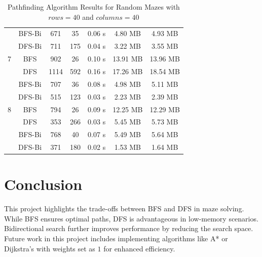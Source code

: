 \documentclass[final, journal, 11pt]{report}
\begin{document}
\begin{table}[!htbp]
\begin{tabular}{@{}ccccccc@{}}
	  & BFS-Bi    & 671  & 35   & 0.06 s & 4.80 MB  & 4.93 MB  \\
	  & DFS-Bi    & 711  & 175  & 0.04 s & 3.22 MB  & 3.55 MB  \\ \midrule
	7 & BFS       & 902  & 26   & 0.10 s & 13.91 MB & 13.96 MB \\
	  & DFS       & 1114 & 592  & 0.16 s & 17.26 MB & 18.54 MB \\
	  & BFS-Bi    & 707  & 36   & 0.08 s & 4.98 MB  & 5.11 MB  \\
	  & DFS-Bi    & 515  & 123  & 0.03 s & 2.23 MB  & 2.39 MB  \\ \midrule
	8 & BFS       & 794  & 26   & 0.09 s & 12.25 MB & 12.29 MB \\
	  & DFS       & 353  & 266  & 0.03 s & 5.45 MB  & 5.73 MB  \\
	  & BFS-Bi    & 768  & 40   & 0.07 s & 5.49 MB  & 5.64 MB  \\
	  & DFS-Bi    & 371  & 180  & 0.02 s & 1.53 MB  & 1.64 MB  \\ \bottomrule
	\end{tabular}
	\caption{Pathfinding Algorithm Results for Random Mazes with $rows = 40$ and $columns = 40$}
	\end{table}
	
	\section*{Conclusion}
	This project highlights the trade-offs between BFS and DFS in maze solving. While BFS ensures optimal paths, DFS is advantageous in low-memory scenarios. Bidirectional search further improves performance by reducing the search space. Future work in this project includes implementing algorithms like A* or Dijkstra's with weights set as $1$ for enhanced efficiency.
	
	\nocite{*}
	\printbibliography
\end{document}
